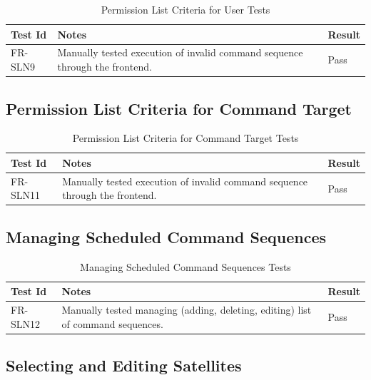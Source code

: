 \documentclass[12pt, titlepage]{article}
\begin{document}
\begin{center}
\begin{longtable}{|p{2cm} | p{8cm} |p{2cm}| }
\caption{Permission List Criteria for User Tests}
\hline
\textbf{Test Id} & \textbf{Notes} & \textbf{Result} \\
\hline
FR-SLN9 & Manually tested execution of invalid command sequence through the frontend. & Pass \\
\hline

\end{longtable}
\end{center}

\subsection{Permission List Criteria for Command Target}

\begin{center}
\begin{longtable}{|p{2cm} | p{8cm} |p{2cm}| }
\caption{Permission List Criteria for Command Target Tests}
\hline
\textbf{Test Id} & \textbf{Notes} & \textbf{Result} \\
\hline
FR-SLN11 & Manually tested execution of invalid command sequence through the frontend. & Pass \\
\hline

\end{longtable}
\end{center}

\subsection{Managing Scheduled Command Sequences}

\begin{center}
\begin{longtable}{|p{2cm} | p{8cm} |p{2cm}| }
\caption{Managing Scheduled Command Sequences Tests}
\hline
\textbf{Test Id} & \textbf{Notes} & \textbf{Result} \\
\hline
FR-SLN12 & Manually tested managing (adding, deleting, editing) list of command sequences. & Pass \\
\hline

\end{longtable}
\end{center}

\subsection{Selecting and Editing Satellites}
\end{document}

